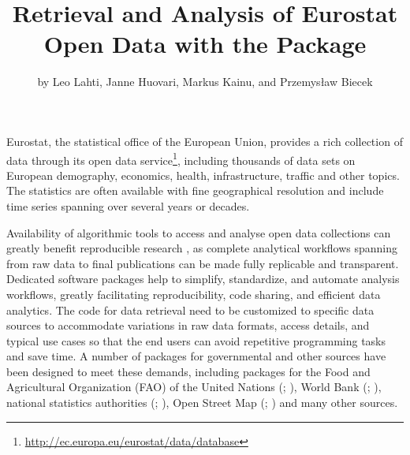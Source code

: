 \title{Retrieval and Analysis of Eurostat Open Data with the  Package}
\author{by Leo Lahti, Janne Huovari, Markus Kainu, and Przemys{\l}aw Biecek}

\maketitle


Eurostat, the statistical office of the European Union, provides a
rich collection of data through its open data
service\footnote{\url{http://ec.europa.eu/eurostat/data/database}},
including thousands of data sets on European demography, economics,
health, infrastructure, traffic and other topics. The statistics are
often available with fine geographical resolution and include time
series spanning over several years or decades.

Availability of algorithmic tools to access and analyse open data
collections can greatly benefit reproducible research \citep{Gandrud13, Boettiger2015}, as complete analytical workflows spanning from raw data to final publications can be made fully replicable and transparent. Dedicated software packages help to simplify, standardize, and automate analysis workflows, greatly
facilitating reproducibility, code sharing, and efficient data
analytics. The code for data retrieval need to be customized to specific data
sources to accommodate variations in raw data formats, access details,
and typical use cases so that the end users can avoid repetitive
programming tasks and save time. A number of packages for governmental
and other sources have been designed to meet these demands, including
packages for the Food and Agricultural Organization (FAO) of the
United Nations (; \citealt{FAOSTAT}), World Bank
(; \citealt{WDI}), national statistics authorities (; \citealt{pxweb}), Open Street Map (; \citealt{osmar}) and many other sources.

